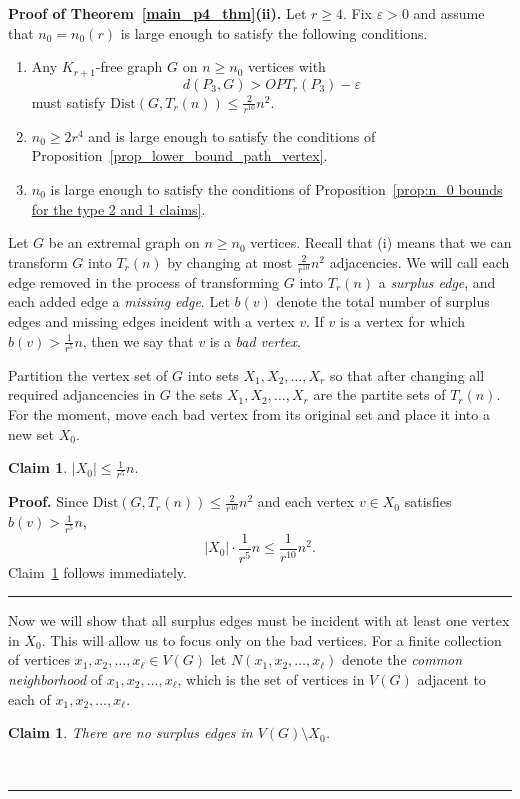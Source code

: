 \documentclass[12pt]{article}
\newtheorem{claim}[thm]{Claim}
\renewenvironment{proof}[1][Proof]{\textbf{#1.} }{\ \rule{0.5em}{0.5em}}
\begin{document}
\begin{proof}[Proof of Theorem~\ref{main_p4_thm}(ii)]
Let $r\geq 4$. Fix $\varepsilon > 0$ and assume that $n_0 = n_0(r)$ is large enough to satisfy the following conditions.
\begin{enumerate}
    \item[(i)] Any $K_{r+1}$-free graph $G$ on $n \geq n_0$ vertices with
\[ 
d(P_3,G) > OPT_r(P_3) - \varepsilon
\]
must satisfy $\text{Dist}(G,T_r(n)) \leq \frac{2}{r^{10}}n^2$.
\item[(ii)] $n_0 \geq 2r^4$ and is large enough to satisfy the conditions of Proposition~\ref{prop_lower_bound_path_vertex}.
\item[(iii)] $n_0$ is large enough to satisfy the conditions of Proposition~\ref{prop:n_0 bounds for the type 2 and 1 claims}.
\end{enumerate}

Let $G$ be an extremal graph on $n \geq n_0$ vertices. Recall that (i) means that we can transform $G$ into $T_r(n)$ by changing at most $\frac{2}{r^{10}}n^2$ adjacencies.
We will call each edge removed in the process of transforming $G$ into $T_r(n)$ a \emph{surplus edge}, and each added edge a \emph{missing edge}. Let $b(v)$ denote the total number of surplus edges and missing edges incident with a vertex $v$. If $v$ is a vertex for which $b(v) > \frac{1}{r^5} n$, then we say that $v$ is a \emph{bad vertex}. 

Partition the vertex set of $G$ into sets $X_1,X_2,\dots,X_r$ so that after changing all required adjancencies in $G$ the sets $X_1,X_2,\dots,X_r$ are the partite sets of $T_r(n)$. For the moment, move each bad vertex from its original set and place it into a new set $X_0$.
\begin{claim}\label{claim_ub_size_X0}
$|X_0| \leq \frac{1}{r^5} n.$
\end{claim}
\begin{proof}
Since $\text{Dist}(G,T_r(n)) \leq \frac{2}{r^{10}}n^2$ and each vertex $v \in X_0$ satisfies $b(v) > \frac{1}{r^5}n$, 
\[ |X_0|\cdot \frac{1}{r^5}n \leq \frac{1}{r^{10}} n^2.\]
Claim~\ref{claim_ub_size_X0} follows immediately.
\end{proof}

Now we will show that all surplus edges must be incident with at least one vertex in $X_0$. This will allow us to focus only on the bad vertices. For a finite collection of vertices $x_1,x_2,\dots,x_{\ell} \in V(G)$ let $N(x_1,x_2,\dots,x_{\ell})$ denote the \emph{common neighborhood} of $x_1,x_2,\dots,x_{\ell}$, which is the set of vertices in $V(G)$ adjacent to each of $x_1,x_2,\dots,x_{\ell}.$
\begin{claim}\label{claim_no_surplus_edges_inX_0}
There are no surplus edges in $V(G) \setminus X_0$. 
\end{claim}


\end{proof}
\end{document}
